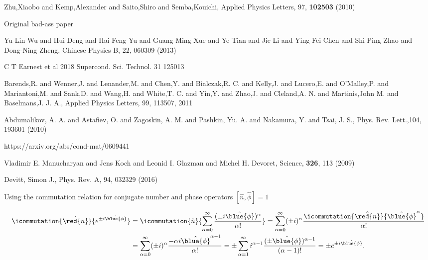 \begin{thebibliography}{99}
  Zhu,Xiaobo and  Kemp,Alexander and  Saito,Shiro and  Semba,Kouichi, Applied
  Physics Letters, 97, \textbf{102503} (2010)


 Original bad-ass paper


 {Yu-Lin Wu  and Hui Deng and Hai-Feng  Yu and Guang-Ming Xue and  Ye Tian and
    Jie Li  and Ying-Fei  Chen and Shi-Ping  Zhao and Dong-Ning  Zheng}, {Chinese  Physics B},
  {22}, {060309} (2013)

 C T Earnest et al 2018 Supercond. Sci. Technol. 31 125013
  
  {Barends,R.    and  Wenner,J.    and  Lenander,M.   and   Chen,Y.   and
    Bialczak,R.   C.  and  Kelly,J.  and  Lucero,E.  and  O'Malley,P.  and  Mariantoni,M.  and
    Sank,D.  and Wang,H.  and  White,T.  C.  and Yin,Y.  and Zhao,J.   and Cleland,A.  N.  and
    Martinis,John M. and Baselmans,J.  J. A.}, {Applied Physics Letters}, 99, {113507}, {2011}

 {Abdumalikov,  A.  A.  and Astafiev,  O.  and Zagoskin, A.   M.  and
    Pashkin, Yu.  A.  and  Nakamura, Y.  and Tsai, J.  S.},  {Phys.  Rev. Lett.},104, {193601}
  (2010)

 https://arxiv.org/abs/cond-mat/0609441

 {Vladimir  E. Manucharyan and Jens  Koch and Leonid I.   Glazman and
    Michel H. Devoret}, {Science}, \textbf{326}, 113 (2009)

 Devitt, Simon J., Phys. Rev. A, {94}, {032329} (2016)

  Using the  commutation  relation  for conjugate  number  and phase  operators
  $ \left[\hat{n},\hat{\phi}\right] = 1 $
 
  {\scriptsize\begin{equation}\label{eq:ab1}
      \begin{aligned}
        \icommutation{\hat{\red{n}}}{e^{\pm i \hat{\blue{\phi}}}} & =  \icommutation{\hat{n}}{\sum_{\alpha = 0}^{\infty} \frac{(\pm i\hat{\blue{\phi}})^\alpha}{\alpha!}} = \sum_{\alpha = 0}^{\infty} (\pm i)^\alpha\frac{\icommutation{\hat{\red{n}}}{\hat{\blue{\phi}}^\alpha}}{\alpha!}\\
        & = \sum_{\alpha =  0}^{\infty} (\pm i)^\alpha\frac{-\alpha i\hat{\blue{\phi}}^{\alpha
            -    1}}{\alpha!}      =    \pm    \sum_{\alpha    =     1}^{\infty}i^{\alpha    -
          1}\frac{(\pm\hat{\blue{\phi}})^{\alpha   -  1}}{(\alpha   -  1)!}    =  \pm   e^{\pm
          i\hat{\blue{\phi}}}.
      \end{aligned}
    \end{equation}}
 

\end{thebibliography}

